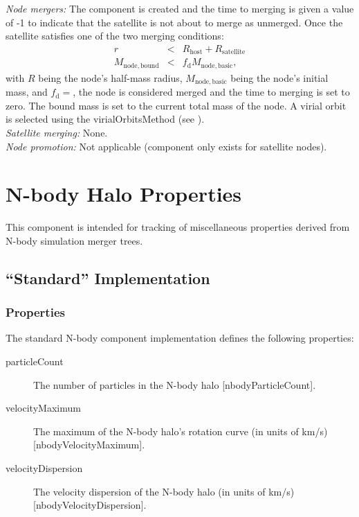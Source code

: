 \noindent\emph{Node mergers:} The \gls{component} is created and the time to merging is given a value of -1 to indicate that the satellite is not about to merge as unmerged.  Once the satellite satisfies one of the two merging conditions:
\begin{eqnarray}
r&<&R_\mathrm{host}+R_\mathrm{satellite}\\
M_\mathrm{node,bound}&<&f_\mathrm{d} M_\mathrm{node,basic},
\end{eqnarray}
with $R$ being the node's half-mass radius, $M_\mathrm{node,basic}$ being the node's initial mass, and $f_\mathrm{d}=${\normalfont \ttfamily [satelliteOrbitingDestructionMassFraction]}, the node is considered merged and the time to merging is set to zero. The bound mass is set to the current total mass of the node. A virial orbit is selected using the {\normalfont \ttfamily virialOrbitsMethod} (see ). \\

\noindent\emph{Satellite merging:} None.\\

\noindent\emph{Node promotion:} Not applicable (component only exists for satellite nodes).\\

\section{N-body Halo Properties}

This component is intended for tracking of miscellaneous properties derived from N-body simulation merger trees.

\subsection{``Standard'' Implementation}

\subsubsection{Properties}

The standard N-body component implementation defines the following properties:
\begin{description}
 \item [{\normalfont \ttfamily particleCount}] The number of particles in the N-body halo [{\normalfont \ttfamily nbodyParticleCount}].
 \item [{\normalfont \ttfamily velocityMaximum}] The maximum of the N-body halo's rotation curve (in units of km/s) [{\normalfont \ttfamily nbodyVelocityMaximum}].
 \item [{\normalfont \ttfamily velocityDispersion}] The velocity dispersion of the N-body halo (in units of km/s) [{\normalfont \ttfamily nbodyVelocityDispersion}].
\end{description}


